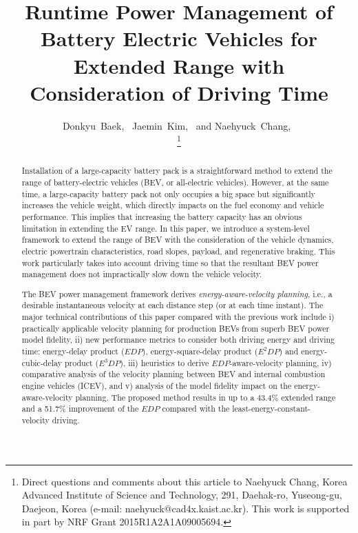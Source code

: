 \documentclass{IEEEtran}
\begin{document}
\title{Runtime Power Management of Battery Electric Vehicles for Extended Range with Consideration of Driving Time}

\author{
Donkyu~Baek,~
Jaemin~Kim,~ and
Naehyuck~Chang,~

\thanks{Direct questions and comments about this article to Naehyuck Chang, Korea Advanced Institute of Science and Technology, 291, Daehak-ro, Yuseong-gu, Daejeon, Korea (e-mail: naehyuck@cad4x.kaist.ac.kr). This work is supported in part by NRF Grant 2015R1A2A1A09005694.}
}

\maketitle


\begin{abstract}
Installation of a large-capacity battery pack is a straightforward method to extend the range of battery-electric vehicles (BEV, or all-electric vehicles). However, at the same time, a large-capacity battery pack not only occupies a big space but significantly increases the vehicle weight, which directly impacts on the fuel economy and vehicle performance. This implies that increasing the battery capacity has an obvious limitation in extending the EV range. 
In this paper, we introduce a system-level framework to extend the range of BEV with the consideration of the vehicle dynamics, electric powertrain characteristics, road slopes, payload, and regenerative braking. This work particularly takes into account driving time so that the resultant BEV power management does not impractically slow down the vehicle velocity. 

The BEV power management framework derives \textit{energy-aware-velocity planning}, i.e., a desirable instantaneous velocity at each distance step (or at each time instant). The major technical contributions of this paper compared with the previous work include i) practically applicable velocity planning for production BEVs from superb BEV power model fidelity, ii) new performance metrics to consider both driving energy and driving time: energy-delay product ($EDP$), energy-square-delay product ($E^2DP$) and energy-cubic-delay product ($E^3DP$), iii) heuristics to derive $EDP$-aware-velocity planning, iv) comparative analysis of the velocity planning between BEV and internal combustion engine vehicles (ICEV), and v) analysis of the model fidelity impact on the energy-aware-velocity planning. The proposed method results in up to a 43.4\% extended range and a 51.7\% improvement of the $EDP$ compared with the least-energy-constant-velocity driving.
\end{abstract}
\end{document}
